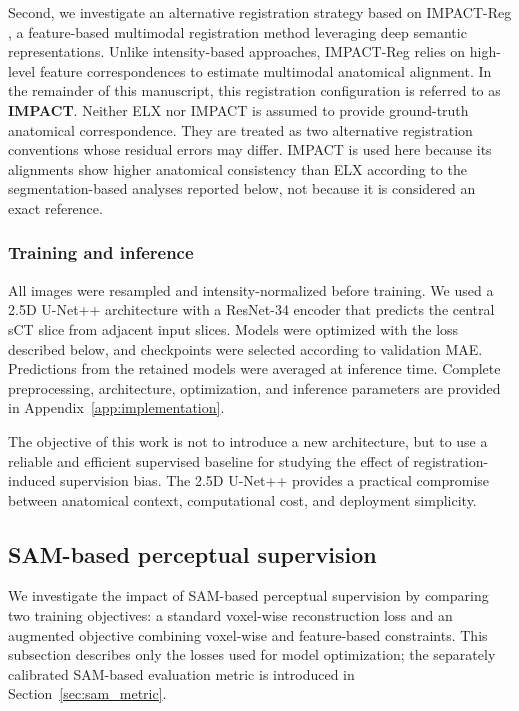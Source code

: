 \documentclass[lettersize,journal]{IEEEtran}
\begin{document}
Second, we investigate an alternative registration strategy based on IMPACT-Reg \cite{boussot2025impact}, a feature-based multimodal registration method leveraging deep semantic representations. 
Unlike intensity-based approaches, IMPACT-Reg relies on high-level feature correspondences to estimate multimodal anatomical alignment.
In the remainder of this manuscript, this registration configuration is referred to as \textbf{IMPACT}. 
Neither ELX nor IMPACT is assumed to provide ground-truth anatomical correspondence. They are treated as two alternative registration conventions whose residual errors may differ. IMPACT is used here because its alignments show higher anatomical consistency than ELX according to the segmentation-based analyses reported below, not because it is considered an exact reference.

\subsubsection{Training and inference}

All images were resampled and intensity-normalized before training. We used a 2.5D U-Net++ architecture with a ResNet-34 encoder \cite{zhou2018unet++} that predicts the central sCT slice from adjacent input slices. Models were optimized with the loss described below, and checkpoints were selected according to validation MAE. Predictions from the retained models were averaged at inference time. Complete preprocessing, architecture, optimization, and inference parameters are provided in Appendix~\ref{app:implementation}.

The objective of this work is not to introduce a new architecture, but to use a reliable and efficient supervised baseline for studying the effect of registration-induced supervision bias. The 2.5D U-Net++ provides a practical compromise between anatomical context, computational cost, and deployment simplicity.

\subsection{SAM-based perceptual supervision}
\label{sec:sam_supervision}

We investigate the impact of SAM-based perceptual supervision by comparing two training objectives: a standard voxel-wise reconstruction loss and an augmented objective combining voxel-wise and feature-based constraints. This subsection describes only the losses used for model optimization; the separately calibrated SAM-based evaluation metric is introduced in Section~\ref{sec:sam_metric}.
\end{document}
